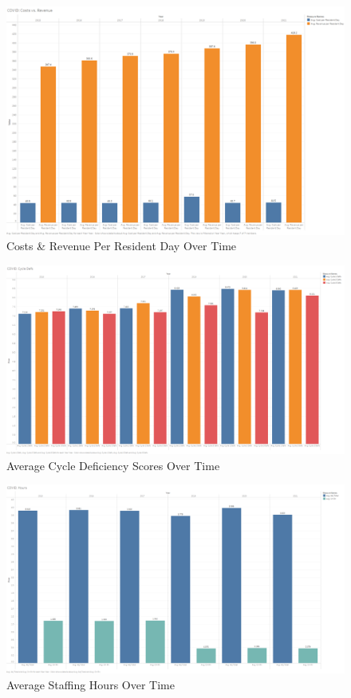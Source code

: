 \documentclass{article}
\theoremstyle{mytheoremstyle}
\theoremstyle{mytheoremstyle}
\theoremstyle{myproblemstyle}
\begin{document}
\begin{figure}[htbp]
\centering
\includegraphics[width=\linewidth]{Images/COVID Costs vs. Revenue.png}
\caption{Costs \& Revenue Per Resident Day Over Time}
\label{fig:Robust Scaler Results}
\end{figure}
\pagebreak
\begin{figure}[htbp]
\centering
\includegraphics[width=\linewidth]{Images/COVID Cycle Defs.png}
\caption{Average Cycle Deficiency Scores Over Time}
\label{fig:Robust Scaler Results}
\end{figure}
\begin{figure}[htbp]
\centering
\includegraphics[width=\linewidth]{Images/COVID Hours.png}
\caption{Average Staffing Hours Over Time}
\label{fig:Robust Scaler Results}
\pagebreak
\end{figure}
\end{document}

